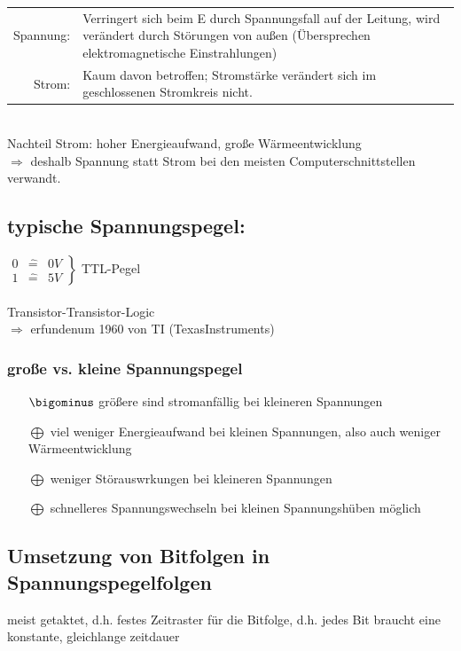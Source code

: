 \documentclass[10pt,a4paper]{scrartcl}
\begin{document}
\begin{tabularx}{\linewidth}{r X}
	Spannung: & Verringert sich beim E durch Spannungsfall auf der Leitung, wird verändert durch Störungen von außen (\glqq Übersprechen\grqq\, elektromagnetische Einstrahlungen)\\
	Strom: & Kaum davon betroffen; Stromstärke verändert sich im geschlossenen Stromkreis nicht.\\
\end{tabularx}
\\
Nachteil Strom: hoher Energieaufwand, große Wärmeentwicklung\\
\hspace*{2em}$\Rightarrow$ deshalb Spannung statt Strom bei den meisten Computerschnittstellen verwandt.
\\

\subsection*{typische Spannungspegel:}
\hspace*{3em}
$ \left.  \begin{array}{ccc}
0 & \hat{=} & 0V \\
1 & \hat{=} & 5V
\end{array} \right\rbrace 
$ TTL-Pegel
\\\\
\glqq Transistor-Transistor-Logic\grqq \\
\hspace*{2em} $\Rightarrow$ \glqq erfunden\grqq um 1960 von TI (TexasInstruments)

\subsubsection*{große vs. kleine Spannungspegel}

\begin{itemize}
	\item[$\bigominus$] größere sind stromanfällig bei kleineren Spannungen
	\item[$\bigoplus$] viel weniger Energieaufwand bei kleinen Spannungen, also auch weniger Wärmeentwicklung
	\item[$\bigoplus$] weniger Störauswrkungen bei kleineren Spannungen
	\item[$\bigoplus$] schnelleres Spannungswechseln bei kleinen Spannungshüben möglich
\end{itemize}

\subsection{Umsetzung von Bitfolgen in Spannungspegelfolgen}
\hspace*{2em} meist getaktet, d.h. festes Zeitraster für die Bitfolge, d.h. jedes Bit braucht eine konstante, gleichlange zeitdauer
\end{document}
